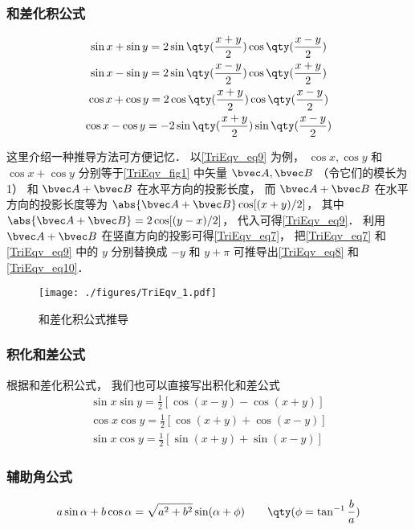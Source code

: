 \subsubsection{和差化积公式}
\begin{gather}
\sin x + \sin y = 2\sin\qty(\frac{x + y}{2})\cos\qty(\frac{x - y}{2})\label{TriEqv_eq7}\\
\sin x - \sin y = 2\sin\qty(\frac{x - y}{2})\cos\qty(\frac{x + y}{2})\label{TriEqv_eq8}\\
\cos x + \cos y = 2\cos\qty(\frac{x+y}{2})\cos\qty(\frac{x-y}{2})\label{TriEqv_eq9}\\
\cos x - \cos y = -2\sin\qty(\frac{x+y}{2})\sin\qty(\frac{x-y}{2})\label{TriEqv_eq10}
\end{gather}

这里介绍一种推导方法可方便记忆． 以\autoref{TriEqv_eq9} 为例， $\cos x, \cos y$ 和 $\cos x + \cos y$ 分别等于\autoref{TriEqv_fig1} 中矢量 $\bvec A, \bvec B$ （令它们的模长为 1） 和 $\bvec A + \bvec B$ 在水平方向的投影长度， 而 $\bvec A + \bvec B$ 在水平方向的投影长度等为 $\abs{\bvec A + \bvec B}\cos[(x+y)/2]$， 其中 $\abs{\bvec A + \bvec B} = 2\cos [(y-x)/2]$， 代入可得\autoref{TriEqv_eq9}． 利用 $\bvec A + \bvec B$ 在竖直方向的投影可得\autoref{TriEqv_eq7}， 把\autoref{TriEqv_eq7} 和\autoref{TriEqv_eq9} 中的 $y$ 分别替换成 $-y$ 和 $y+\pi$ 可推导出\autoref{TriEqv_eq8} 和\autoref{TriEqv_eq10}．
\begin{figure}[ht]
\centering
\texttt{[image: ./figures/TriEqv\_1.pdf]}
\caption{和差化积公式推导} \label{TriEqv_fig1}
\end{figure}

\subsubsection{积化和差公式}
根据和差化积公式， 我们也可以直接写出积化和差公式
\begin{gather}
\label{TriEqv_eq11}
\sin x\sin y = \frac12 [\cos(x - y) - \cos(x + y)]\\
\label{TriEqv_eq12}
\cos x\cos y = \frac12 [\cos(x + y) + \cos(x - y)]\\
\label{TriEqv_eq14}
\sin x\cos y = \frac12 [\sin(x + y) + \sin(x - y)]
\end{gather}

\subsubsection{辅助角公式}
\begin{equation}
a\sin\alpha + b\cos\alpha = \sqrt{a^2+b^2}\sin(\alpha + \phi) \qquad \qty(\phi = \tan^{-1}\frac{b}{a})
\end{equation}
